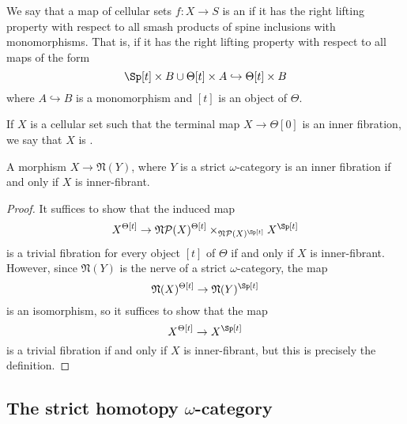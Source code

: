 \begin{defn} We say that a map of cellular sets \(f:X\to S\) is an  if it has the right lifting property with respect to all smash products of spine inclusions with monomorphisms.  That is, if it has the right lifting property with respect to all maps of the form \[\Sp[t] \times B \cup \Theta[t] \times A\hookrightarrow \Theta[t]\times B\] where \(A\hookrightarrow B\) is a monomorphism and \([t]\) is an object of \(\Theta\).  

If \(X\) is a cellular set such that the terminal map \(X\to \Theta[0]\) is an inner fibration, we say that \(X\) is . 
\end{defn}


\begin{prop}A morphism \(X\to \mathfrak{N}(Y)\), where \(Y\) is a strict \(\omega\)-category is an inner fibration if and only if \(X\) is inner-fibrant.
\end{prop}
\begin{proof}
It suffices to show that the induced map \[X^{\Theta[t]}\to \mathfrak{N}\mathcal{P}(X)^{\Theta[t]}\times_{\mathfrak{N}\mathcal{P}(X)^{\Sp[t]}} X^{\Sp[t]}\] is a trivial fibration for every object \([t]\) of \(\Theta\) if and only if \(X\) is inner-fibrant.  However, since \(\mathfrak{N}(Y)\) is the nerve of a strict \(\omega\)-category, the map \[\mathfrak{N}(X)^{\Theta[t]}\to \mathfrak{N}(Y)^{\Sp[t]}\] is an isomorphism, so it suffices to show that the map \[X^{\Theta[t]}\to X^{\Sp[t]}\] is a trivial fibration if and only if \(X\) is inner-fibrant, but this is precisely the definition.  
\end{proof}

\subsection{The strict homotopy \(\omega\)-category}\label{hocat}

